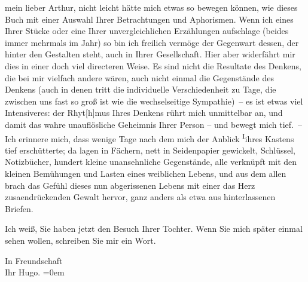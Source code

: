 \pstart{}mein lieber Arthur,\pend\vspace{0.5em}
\pstart
           nicht leicht hätte mich etwas so bewegen können, wie dieses Buch mit einer Auswahl Ihrer Betrachtungen und Aphorismen. Wenn
               ich eines Ihrer Stücke oder eine Ihrer unvergleichlichen Erzählungen aufschlage
               (beides immer mehrmals im Jahr) so bin ich freilich vermöge der Gegenwart dessen, der
               hinter den Gestalten steht, auch in Ihrer Gesellschaft. Hier aber widerfährt mir dies
               in einer doch viel directeren Weise. Es sind nicht die Resultate des Denkens, die bei
               mir vielfach andere wären, auch nicht einmal die Gegenstände des Denkens (auch in
               denen tritt die individuelle Verschiedenheit zu Tage, die zwischen uns fast so groß
               ist wie die wechselseitige Sympathie) – {\pb}es ist etwas viel Intensiveres:
               der Rhyt{[}h{]}mus Ihres Denkens rührt mich unmittelbar an, und damit
               das wahre unauflösliche Geheimnis Ihrer Person – und bewegt mich tief. – Ich erinnere
               mich, dass wenige Tage nach dem \label{K_L02496-1v}\label{K_L02496-1} mich der Anblick \substVorne{}\textsuperscript{I}\substDazwischen{}i\substHinten{}hres Kastens tief erschütterte; da lagen in Fächern, nett in Seidenpapier
               gewickelt, Schlüssel, Notizbücher, hundert kleine unansehnliche Gegenstände, alle
               verknüpft mit den kleinen Bemühungen und Lasten eines weiblichen Lebens, und aus dem
               allen brach das Gefühl dieses nun abgerissenen Lebens mit einer das Herz zusa{\geminationm}endrückenden Gewalt hervor, ganz anders als etwa aus
               hinterlassenen Briefen.\pend
           
\pstart
           Ich weiß, Sie haben jetzt den Besuch Ihrer Tochter. Wenn Sie mich später einmal sehen wollen,
               schreiben Sie mir ein Wort.\pend
           
\pstart
           In Freundschaft{\\[\baselineskip]}Ihr \spacefill\mbox{Hugo.}\pend
           \leftskip=0em{}\endnumbering{}  \newcommand{\dateiname}{L02496}\newcommand{\titel}{Hugo Hofmannsthal an Arthur Schnitzler, 29. 12. 1927}\newcommand{\editorInnen}{Martin Anton Müller und Gerd-Hermann Susen}
